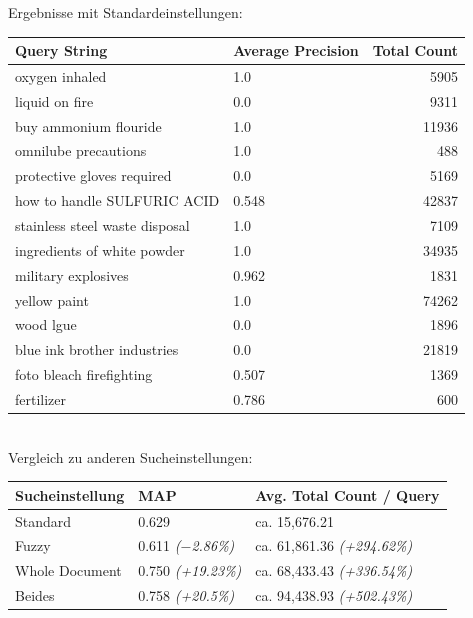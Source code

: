 \documentclass[oneside, a4paper, 12pt, titlepage]{article}
\begin{document}
Ergebnisse mit Standardeinstellungen:\\
\begin{tabular}{|l|l|r|}
\hline
Query String &  Average Precision & Total Count \\ \hline
oxygen inhaled & 1.0 & 5905 \\
liquid on fire       &       0.0         &    9311    \\
     buy ammonium flouride      &        1.0         &   11936    \\
      omnilube precautions      &        1.0         &    488     \\
   protective gloves required   &        0.0         &    5169    \\
  how to handle SULFURIC ACID   & 0.548 &   42837    \\
 stainless steel waste disposal &        1.0         &    7109    \\
  ingredients of white powder   &        1.0         &   34935    \\
      military explosives       & 0.962 &    1831    \\
          yellow paint          &        1.0         &   74262    \\
           wood lgue        	 &      0.0         &  1896    \\
  blue ink brother industries   &        0.0         &   21819    \\
    foto bleach firefighting    & 0.507 &    1369    \\
           fertilizer           & 0.786 &    600     \\
\hline
\end{tabular}\\


Vergleich zu anderen Sucheinstellungen:\\
\begin{tabular}{|l|l|l|}
\hline
Sucheinstellung   & MAP  	       	& Avg. Total Count / Query \\ \hline
Standard        & 0.629		     & ca. 15,676.21\\
Fuzzy           & 0.611 \textit{($-$2.86\%)}  & ca. 61,861.36 \textit{(+294.62\%)}\\
Whole Document  & 0.750 \textit{(+19.23\%)} & ca. 68,433.43 \textit{(+336.54\%)}\\
Beides          	  & 0.758 \textit{(+20.5\%)}  & ca. 94,438.93 \textit{(+502.43\%)}\\
\hline
\end{tabular}\\
\end{document}
